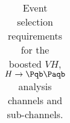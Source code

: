 \begin{table}
{\begin{tabular}{l | c|c|c|c|c|c}
      \bottomrule
    \end{tabular}
    \caption{
        Event selection requirements for the boosted $VH$, $H \to \bbbar$ analysis channels and sub-channels.
    }
    \label{tab:vhbb_selection}
    }
  \end{table}
  